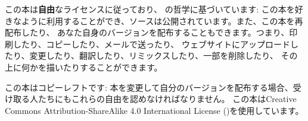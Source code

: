 \lettrine[lraise=-0.03,loversize=0.08]{こ}{の本}は\textbf{自由}なライセンスに従っており、
の哲学に基づいています:
この本を好きなように利用することができ、ソースは公開されています。また、この本を再配布したり、
あなた自身のバージョンを配布することもできます。つまり、印刷したり、コピーしたり、メールで送ったり、
ウェブサイトにアップロードしたり、変更したり、翻訳したり、リミックスしたり、一部を削除したり、
その上に何かを描いたりすることができます。

この本はコピーレフトです: 本を変更して自分のバージョンを配布する場合、受け取る人たちにもこれらの自由を認めなければなりません。
この本はCreative Commons Attribution-ShareAlike 4.0 International License
(\href{http://creativecommons.org/licenses/by-sa/4.0/}{})を使用しています。
